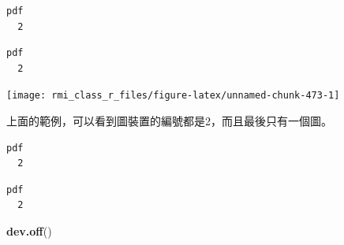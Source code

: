 \documentclass[]{book}
\newenvironment{Shaded}{\begin{snugshade}}{\end{snugshade}}
\newcommand{\KeywordTok}[1]{\textcolor[rgb]{0.13,0.29,0.53}{\textbf{#1}}}
\newcommand{\NormalTok}[1]{#1}
\newcommand{\OperatorTok}[1]{\textcolor[rgb]{0.81,0.36,0.00}{\textbf{#1}}}
\theoremstyle{definition}
\theoremstyle{definition}
\theoremstyle{definition}
\theoremstyle{remark}
\begin{document}
\begin{Shaded}
\end{Shaded}

\begin{verbatim}
pdf 
  2 
\end{verbatim}

\begin{Shaded}
\end{Shaded}

\begin{verbatim}
pdf 
  2 
\end{verbatim}

\begin{center}\texttt{[image: rmi\_class\_r\_files/figure-latex/unnamed-chunk-473-1]} \end{center}

上面的範例，可以看到圖裝置的編號都是2，而且最後只有一個圖。

\begin{Shaded}
\end{Shaded}

\begin{verbatim}
pdf 
  2 
\end{verbatim}

\begin{Shaded}
\end{Shaded}

\begin{verbatim}
pdf 
  2 
\end{verbatim}

\begin{Shaded}
\begin{Highlighting}[]
\KeywordTok{dev.off}\NormalTok{()}
\end{Highlighting}
\end{Shaded}
\end{document}
